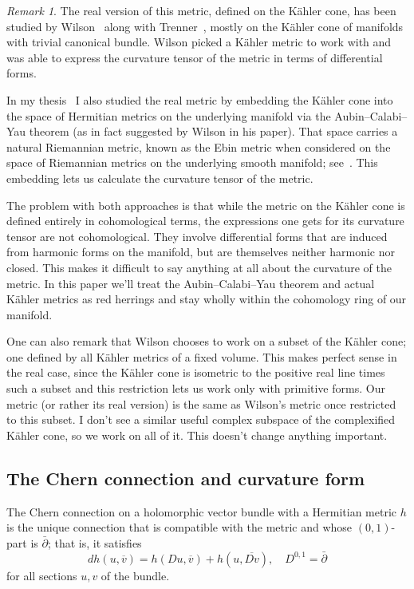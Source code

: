 \documentclass[11pt,a4paper]{amsart}
\theoremstyle{definition}
\theoremstyle{remark}
\newtheorem*{rema}{Remark}
\def\ov#1{\overline{#1}}
\def\dbar{\bar\partial}
\def\chern{D}
\def\ton{u}
\def\ttw{v}
\begin{document}
\begin{rema}
The real version of this metric, defined on the K\"{a}hler cone, has been
studied by Wilson~\cite{Wilson} along with Trenner~\cite{WilsonTrenner},
mostly on the K\"{a}hler cone of manifolds with trivial canonical bundle.
Wilson picked a K\"{a}hler metric to work with and was able to express the
curvature tensor of the metric in terms of differential forms.

In my thesis~\cite{Magnusson} I also studied the real metric by
embedding the K\"{a}hler cone into the space of Hermitian metrics on the
underlying manifold via the Aubin--Calabi--Yau theorem (as in fact
suggested by Wilson in his paper). That space carries a natural
Riemannian metric, known as the Ebin metric when considered on the space
of Riemannian metrics on the underlying smooth manifold;
see~\cite{Ebin,ClarkeRubinstein}. This embedding lets us calculate the
curvature tensor of the metric.

The problem with both approaches is that while the metric on the K\"{a}hler
cone is defined entirely in cohomological terms, the expressions one
gets for its curvature tensor are not cohomological. They involve
differential forms that are induced from harmonic forms on the manifold,
but are themselves neither harmonic nor closed. This makes it difficult
to say anything at all about the curvature of the metric. In this paper
we'll treat the Aubin--Calabi--Yau theorem and actual K\"{a}hler metrics as
red herrings and stay wholly within the cohomology ring of our manifold.

One can also remark that Wilson chooses to work on a subset of the
K\"{a}hler cone; one defined by all K\"{a}hler metrics of a fixed volume. This
makes perfect sense in the real case, since the K\"{a}hler cone is isometric
to the positive real line times such a subset and this restriction lets
us work only with primitive forms. Our metric (or rather its real version)
is the same as Wilson's metric once restricted to this subset.  I don't
see a similar useful complex subspace of the complexified K\"{a}hler cone, so
we work on all of it. This doesn't change anything important.
\end{rema}



\subsection*{The Chern connection and curvature form}

The Chern connection on a holomorphic vector bundle with a Hermitian
metric $h$ is the unique connection that is compatible with the metric
and whose $(0,1)$-part is $\dbar$; that is, it satisfies
$$
d h(\ton, \ov{\ttw}) 
= h(\chern \ton, \ov{\ttw}) + h(\ton, \ov{\chern \ttw}),
\quad
\chern^{0,1} = \dbar
$$
for all sections $u, v$ of the bundle.
\end{document}
